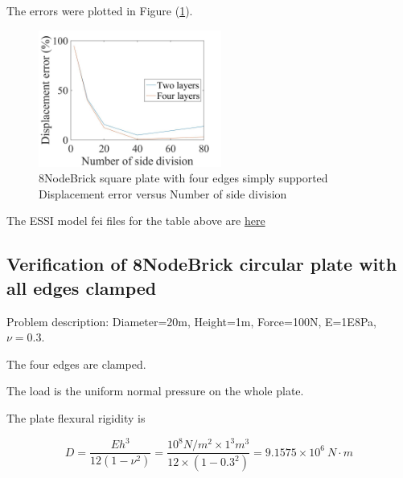 \documentclass[fleqn,11pt,letter]{article}
\begin{document}
The errors were plotted in Figure (\ref{fig 8NodeBrick square plate with four edge simply supported}).
\begin{figure}[H]
    \centering
    \includegraphics[width=6cm]{../Figure_files/8NodeBrick/error8brick_square_plate_simply_supported.jpeg}
  \captionsetup{justification=centering,margin=3cm}
  \caption{8NodeBrick square plate with four edges simply supported\\
      Displacement error   versus   Number of side division}
  \label{fig 8NodeBrick square plate with four edge simply supported}
\end{figure}


The ESSI model fei files for the table above are \href{https://github.com/yuan-energy/ESSI_Verification/blob/master/8NodeBrick/square_plate_simply_support/square_plate_simply_support.tar.gz?raw=true}{here}

























\newpage
\subsection{Verification of 8NodeBrick circular plate with all edges clamped}

Problem description: Diameter=20m, Height=1m, Force=100N, E=1E8Pa, $\nu=0.3$. 

The four edges are clamped. 

The load is the uniform normal pressure on the whole plate. 


The plate flexural rigidity is 

\begin{equation}
  D=\frac{Eh^3}{12(1-\nu^2)}=\frac{10^8 N/m^2 \times 1^3 m^3 }{12 \times (1-0.3^2) }= 9.1575 \times 10^6 \ N\cdot m
\end{equation}
\end{document}

